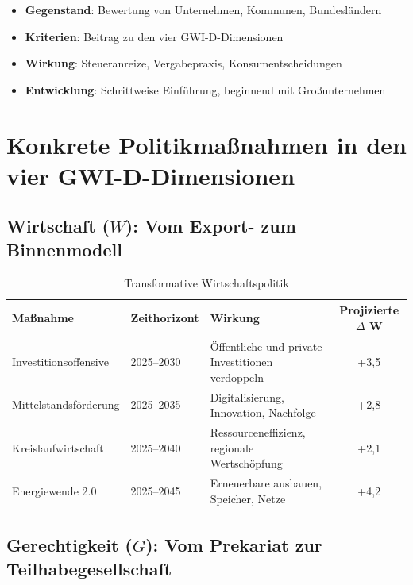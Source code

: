 \begin{itemize}
    \item \textbf{Gegenstand}: Bewertung von Unternehmen, Kommunen, Bundesländern
    \item \textbf{Kriterien}: Beitrag zu den vier GWI-D-Dimensionen
    \item \textbf{Wirkung}: Steueranreize, Vergabepraxis, Konsumentscheidungen
    \item \textbf{Entwicklung}: Schrittweise Einführung, beginnend mit Großunternehmen
\end{itemize}

\section{Konkrete Politikmaßnahmen in den vier GWI-D-Dimensionen}

\subsection{Wirtschaft (\(W\)): Vom Export- zum Binnenmodell}

\begin{table}[ht]
    \centering
    \caption{Transformative Wirtschaftspolitik}
    \label{tab:wirtschaftspolitik_transformativ}
    \begin{tabular}{llp{6cm}c}
        \toprule
        \textbf{Maßnahme} & \textbf{Zeithorizont} & \textbf{Wirkung} & \textbf{Projizierte $\Delta$ W} \\
        \midrule
        Investitionsoffensive & 2025–2030 & Öffentliche und private Investitionen verdoppeln & +3,5 \\
        Mittelstandsförderung & 2025–2035 & Digitalisierung, Innovation, Nachfolge & +2,8 \\
        Kreislaufwirtschaft & 2025–2040 & Ressourceneffizienz, regionale Wertschöpfung & +2,1 \\
        Energiewende 2.0 & 2025–2045 & Erneuerbare ausbauen, Speicher, Netze & +4,2 \\
        \bottomrule
    \end{tabular}
\end{table}

\subsection{Gerechtigkeit (\(G\)): Vom Prekariat zur Teilhabegesellschaft}

